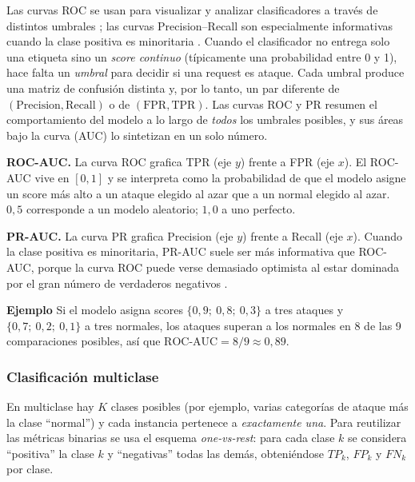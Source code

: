 \documentclass[12pt,oneside]{report}
\begin{document}
Las curvas ROC se usan para visualizar y analizar clasificadores a través de distintos umbrales \cite{fawcett2006}; las curvas Precision--Recall son especialmente informativas cuando la clase positiva es minoritaria \cite{saito_pr_auc}. Cuando el clasificador no entrega solo una etiqueta sino un \emph{score
continuo} (típicamente una probabilidad entre 0 y 1), hace falta un
\emph{umbral} para decidir si una request es ataque. Cada umbral produce
una matriz de confusión distinta y, por lo tanto, un par diferente de
$(\mathrm{Precision},\mathrm{Recall})$ o de $(\mathrm{FPR},\mathrm{TPR})$.
Las curvas ROC y PR resumen el comportamiento del modelo a lo largo de
\emph{todos} los umbrales posibles, y sus áreas bajo la curva (AUC) lo
sintetizan en un solo número.

\textbf{ROC-AUC.} La curva ROC grafica TPR (eje $y$) frente a FPR (eje
$x$). El ROC-AUC vive en $[0,1]$ y se interpreta como la probabilidad de
que el modelo asigne un score más alto a un ataque elegido al azar que a
un normal elegido al azar. $0{,}5$ corresponde a un modelo aleatorio;
$1{,}0$ a uno perfecto.

\textbf{PR-AUC.} La curva PR grafica Precision (eje $y$) frente a Recall
(eje $x$). Cuando la clase positiva es minoritaria, PR-AUC suele ser más
informativa que ROC-AUC, porque la curva ROC puede verse demasiado
optimista al estar dominada por el gran número de verdaderos negativos
\cite{saito_pr_auc}.

\textbf{Ejemplo} Si el modelo asigna scores
$\{0{,}9;\ 0{,}8;\ 0{,}3\}$ a tres ataques y
$\{0{,}7;\ 0{,}2;\ 0{,}1\}$ a tres normales, los ataques superan a los
normales en 8 de las 9 comparaciones posibles, así que
$\mathrm{ROC\text{-}AUC}=8/9\approx 0{,}89$.

\subsubsection{Clasificación multiclase}

En multiclase hay $K$ clases posibles (por ejemplo, varias categorías de
ataque más la clase ``normal'') y cada instancia pertenece a
\emph{exactamente una}. Para reutilizar las métricas binarias se usa el
esquema \emph{one-vs-rest}: para cada clase $k$ se considera ``positiva''
la clase $k$ y ``negativas'' todas las demás, obteniéndose $TP_k$,
$FP_k$ y $FN_k$ por clase.
\end{document}
